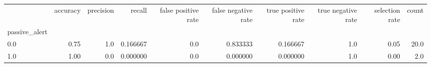 \begin{tabular}{lrrrrrrrrr}
\toprule
{} &  accuracy &  precision &    recall &  false positive rate &  false negative rate &  true positive rate &  true negative rate &  selection rate &  count \\
passive\_alert &           &            &           &                      &                      &                     &                     &                 &        \\
\midrule
0.0           &      0.75 &        1.0 &  0.166667 &                  0.0 &             0.833333 &            0.166667 &                 1.0 &            0.05 &   20.0 \\
1.0           &      1.00 &        0.0 &  0.000000 &                  0.0 &             0.000000 &            0.000000 &                 1.0 &            0.00 &    2.0 \\
\bottomrule
\end{tabular}

